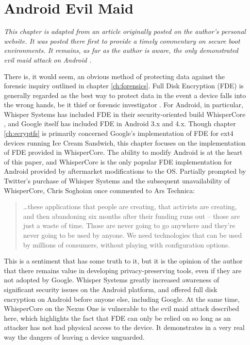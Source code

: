 \chapter{Android Evil Maid}
\label{ch:fde}

\emph{This chapter is adapted from an article originally posted on the author's personal website. It was posted there first to
provide a timely commentary on secure boot environments. It remains, as far as the author is aware, the only demonstrated evil maid
attack on Android \cite{androidevilmaid}.}

There is, it would seem, an obvious method of protecting data against the forensic inquiry outlined in chapter \ref{ch:forensics}.
Full Disk Encryption (FDE) is generally regarded as the best way to protect data in the event a device falls into the wrong hands,
be it thief or forensic investigator \cite{fdeworks}.  For Android, in particular, Whisper Systems has included FDE in their
security-oriented build WhisperCore \cite{whispercore}, and Google itself has included FDE in Android 3.x and 4.x. Though chapter
\ref{ch:ecryptfs} is primarily concerned Google's implementation of FDE for ext4 devices running Ice Cream Sandwich, this chapter
focuses on the implementation of FDE provided in WhisperCore.  The ability to modify Android is at
the heart of this paper, and WhisperCore is the only popular FDE implementation for Android provided by aftermarket modifications to
the OS.  Partially prompted by Twitter's purchase of Whisper Systems and the subsequent unavailability of WhisperCore, Chris
Soghoian once commented to Ars Technica: \begin{quote} 
\ldots these applications that people are creating, that activists are creating, and then abandoning six months after their funding
runs out -- those are just a waste of time. Those are never going to go anywhere and they're never going to be used by anyone. We
need technologies that can be used by millions of consumers, without playing with configuration options. 

\hspace{\fill}\cite{arstechnica}
\end{quote}
This is a sentiment that has some truth to it, but it is the opinion of the author that there remains value in
developing privacy-preserving tools, even if they are not adopted by Google.  Whisper Systems greatly increased awareness of significant
security issues on the Android platform, and offered full disk encryption on Android before anyone else, including Google. 
At the same time, WhisperCore on the Nexus One is vulnerable to the evil maid attack described here, which highlights the fact that FDE can only be
relied on so long as an attacker has not had physical access to the device. It demonstrates in a very real way the dangers of
leaving a device unguarded. 

